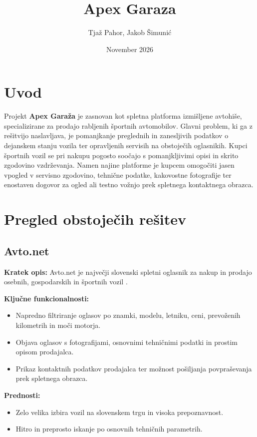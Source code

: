 \documentclass[a4paper,12pt]{article}
\title{Apex Garaza}
\author{Tjaž Pahor, Jakob Šimunić}
\date{November 2026}
\begin{document}
\maketitle
\tableofcontents

\section{Uvod}
Projekt \textbf{Apex Garaža} je zasnovan kot spletna platforma izmišljene avtohiše, specializirane za prodajo rabljenih športnih avtomobilov. Glavni problem, ki ga z rešitvijo naslavljava, je pomanjkanje preglednih in zanesljivih podatkov o dejanskem stanju vozila ter opravljenih servisih na obstoječih oglasnikih. Kupci športnih vozil se pri nakupu pogosto soočajo s pomanjkljivimi opisi in skrito zgodovino vzdrževanja. Namen najine platforme je kupcem omogočiti jasen vpogled v servisno zgodovino, tehnične podatke, kakovostne fotografije ter enostaven dogovor za ogled ali testno vožnjo prek spletnega kontaktnega obrazca.

\section{Pregled obstoječih rešitev}

\subsection{Avto.net}
\textbf{Kratek opis:} Avto.net je največji slovenski spletni oglasnik za nakup in prodajo osebnih, gospodarskih in športnih vozil \cite{avtonet}. 

\textbf{Ključne funkcionalnosti:}
\begin{itemize}
    \item Napredno filtriranje oglasov po znamki, modelu, letniku, ceni, prevoženih kilometrih in moči motorja.
    \item Objava oglasov s fotografijami, osnovnimi tehničnimi podatki in prostim opisom prodajalca.
    \item Prikaz kontaktnih podatkov prodajalca ter možnost pošiljanja povpraševanja prek spletnega obrazca.
\end{itemize}

\textbf{Prednosti:}
\begin{itemize}
    \item Zelo velika izbira vozil na slovenskem trgu in visoka prepoznavnost.
    \item Hitro in preprosto iskanje po osnovnih tehničnih parametrih.
\end{itemize}
\end{document}
